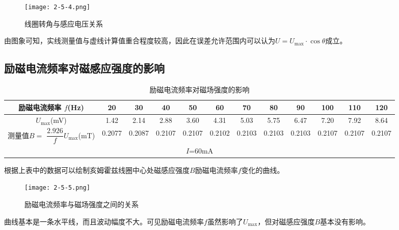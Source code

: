 \documentclass[12pt]{article}
\begin{document}
\begin{figure}[htbp]
    \centering
    \texttt{[image: 2-5-4.png]}
    \caption{线圈转角与感应电压关系}
\end{figure}

由图象可知，实线测量值与虚线计算值重合程度较高，因此在误差允许范围内可以认为$U=U_{\max}\cdot\cos\theta$成立。

\subsection{励磁电流频率对磁感应强度的影响}

\begin{table}[htbp]
    \centering
        \begin{tabular}{|c|c|c|c|c|c|c|c|c|c|c|c|}
        \hline
        \makecell{励磁电流频率 \\ $f$(Hz)} & 20   & 30   & 40   & 50   & 60   & 70   & 80   & 90   & 100  & 110  & 120 \\
        \hline
        $U_{\max}$(mV) & 1.42  & 2.14  & 2.88  & 3.60  & 4.31  & 5.03  & 5.75  & 6.47  & 7.20  & 7.92  & 8.64  \\
        \hline
        \makecell{测量值$B=$ \\ $\dfrac{2.926}{f}U_{\max}$(mT)}  & 0.2077  & 0.2087  & 0.2107  & 0.2107  & 0.2102  & 0.2103  & 0.2103  & 0.2103  & 0.2107  & 0.2107  & 0.2107  \\
        \hline
        \multicolumn{12}{|c|}{$I$=60mA} \\
        \hline
        \end{tabular}%
    \caption{励磁电流频率对磁场强度的影响}
\end{table}

根据上表中的数据可以绘制亥姆霍兹线圈中心处磁感应强度$B$励磁电流频率$f$变化的曲线。

\begin{figure}[htbp]
    \centering
    \texttt{[image: 2-5-5.png]}
    \caption{励磁电流频率与磁场强度之间的关系}
\end{figure}

曲线基本是一条水平线，而且波动幅度不大。可见励磁电流频率$f$虽然影响了$U_{\max}$，但对磁感应强度$B$基本没有影响。
\end{document}
